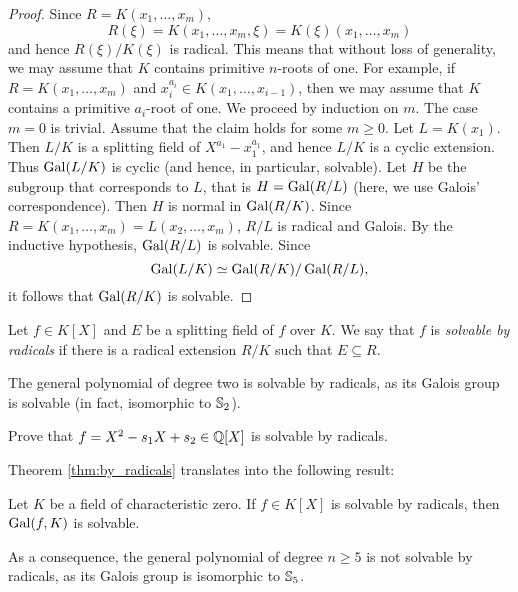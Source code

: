 \begin{proof}
    Since
    $R=K(x_1,\dots,x_m)$,  
    \[
    R(\xi)=K(x_1,\dots,x_m,\xi)=K(\xi)(x_1,\dots,x_m)
    \]
    and hence $R(\xi)/K(\xi)$ is radical. 
    This means that
    without loss of generality, we may assume that
    $K$ contains primitive $n$-roots of one. For example, 
    if $R=K(x_1,\dots,x_m)$ and $x_i^{a_i}\in K(x_1,\dots,x_{i-1})$, 
    then we may assume that $K$ contains a primitive $a_i$-root of one. We proceed by induction on $m$. 
    The case $m=0$ is trivial. Assume that the claim holds for some $m\geq0$. Let 
    $L=K(x_1)$. Then $L/K$ is a splitting field of $X^{a_1}-x_1^{a_1}$, and hence
    $L/K$ is a cyclic extension. Thus $\operatorname{Gal}(L/K)$ is cyclic (and hence, in particular, solvable). 
    Let $H$ be the subgroup that corresponds to $L$, that is
    $H=\operatorname{Gal}(R/L)$ (here, we use Galois' correspondence). Then $H$ is normal in $\operatorname{Gal}(R/K)$. 
    Since $R=K(x_1,\dots,x_m)=L(x_2,\dots,x_m)$, $R/L$ is radical and Galois. By the inductive hypothesis, 
    $\operatorname{Gal}(R/L)$ is solvable. Since 
    \[
    \operatorname{Gal}(L/K)\simeq \operatorname{Gal}(R/K)/\operatorname{Gal}(R/L),
    \]
    it follows that $\operatorname{Gal}(R/K)$ is solvable. 
\end{proof}

\begin{definition}
    Let $f\in K[X]$ and $E$ be a splitting field of $f$ over $K$. 
    We say that $f$ is \emph{solvable by radicals} if
    there is a radical extension $R/K$ such that $E\subseteq R$. 
\end{definition}

The general polynomial of degree two 
is solvable by radicals, as its Galois group 
is solvable (in fact, isomorphic to $\mathbb{S}_2$).  

\begin{exercise}
    Prove that $f=X^2-s_1X+s_2\in\mathbb{Q}[X]$ is solvable by radicals. 
\end{exercise}

Theorem \ref{thm:by_radicals} translates into the following result:

\begin{exercise}
    Let $K$ be a field of characteristic zero. 
    If $f\in K[X]$ is solvable by radicals, then $\operatorname{Gal}(f,K)$ is solvable. 
\end{exercise}

As a consequence, the general polynomial of degree $n\geq5$ 
is not solvable by radicals, as its Galois group is isomorphic to 
$\mathbb{S}_5$. 

